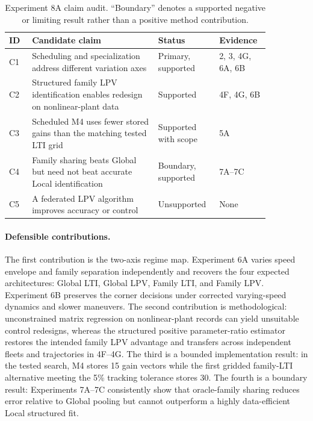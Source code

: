 \begin{table}[htbp]
\centering
\caption{Experiment 8A claim audit. ``Boundary'' denotes a supported negative
or limiting result rather than a positive method contribution.}
\label{tab:experiment8a-claims}
\begin{tabular}{p{0.08\linewidth}p{0.44\linewidth}p{0.18\linewidth}p{0.16\linewidth}}
\toprule
ID & Candidate claim & Status & Evidence\\
\midrule
C1 & Scheduling and specialization address different variation axes & Primary, supported & 2, 3, 4G, 6A, 6B\\
C2 & Structured family LPV identification enables redesign on nonlinear-plant data & Supported & 4F, 4G, 6B\\
C3 & Scheduled M4 uses fewer stored gains than the matching tested LTI grid & Supported with scope & 5A\\
C4 & Family sharing beats Global but need not beat accurate Local identification & Boundary, supported & 7A--7C\\
C5 & A federated LPV algorithm improves accuracy or control & Unsupported & None\\
\bottomrule
\end{tabular}
\end{table}

\paragraph{Defensible contributions.}
The first contribution is the two-axis regime map. Experiment 6A varies speed
envelope and family separation independently and recovers the four expected
architectures: Global LTI, Global LPV, Family LTI, and Family LPV. Experiment 6B
preserves the corner decisions under corrected varying-speed dynamics and slower
maneuvers. The second contribution is methodological: unconstrained matrix
regression on nonlinear-plant records can yield unsuitable control redesigns,
whereas the structured positive parameter-ratio estimator restores the intended
family LPV advantage and transfers across independent fleets and trajectories
in 4F--4G. The third is a bounded implementation result: in the tested search,
M4 stores 15 gain vectors while the first gridded family-LTI alternative meeting
the 5\% tracking tolerance stores 30. The fourth is a boundary result:
Experiments 7A--7C consistently show that oracle-family sharing reduces error
relative to Global pooling but cannot outperform a highly data-efficient Local
structured fit.

